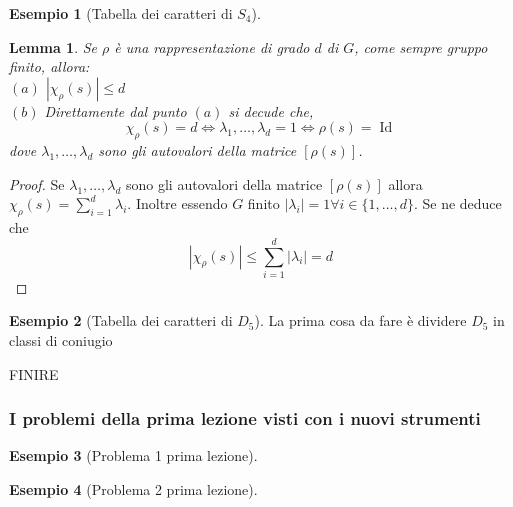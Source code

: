 \documentclass[11pt]{article}
\theoremstyle{plain}
\newtheorem{lemma}[thm]{Lemma}
\theoremstyle{definition}
\newtheorem{exmp}{Esempio}[section]
\theoremstyle{remark}
\DeclareMathOperator{\Id}{Id}
\begin{document}
\begin{exmp}[Tabella dei caratteri di $S_4$]
\begin{lemma}
Se $\rho$ è una rappresentazione di grado $d$ di $G$, come sempre gruppo finito, allora:\\
$(a)$ $|\chi_{\rho}(s)|\leq d$ \\
$(b)$ Direttamente dal punto $(a)$ si decude che, 
\[
\chi_{\rho}(s)=d\Leftrightarrow \lambda_1,\ldots,\lambda_d=1\Leftrightarrow \rho(s)=\Id
\]
dove $\lambda_1,\ldots,\lambda_d$ sono gli autovalori della matrice $[\rho(s)]$.
\end{lemma}

\begin{proof}
 Se $\lambda_1,\ldots,\lambda_d$ sono gli autovalori della matrice $[\rho(s)]$ allora $\chi_{\rho}(s)=\sum_{i=1}^{d}\lambda_i$. Inoltre essendo $G$ finito $|\lambda_i|=1\forall i\in \{1,\ldots,d\}$. Se ne deduce che
\[
|\chi_{\rho}(s)|\leq \sum_{i=1}^d |\lambda_i|=d
\]
\end{proof}


\end{exmp}





\begin{exmp}[Tabella dei caratteri di $D_5$]

La prima cosa da fare è dividere $D_5$ in classi di coniugio


FINIRE

\end{exmp}



\subsubsection{I problemi della prima lezione visti con i nuovi strumenti}
\begin{exmp}[Problema 1 prima lezione]


\end{exmp}

\begin{exmp}[Problema 2 prima lezione]


\end{exmp}
\end{document}
